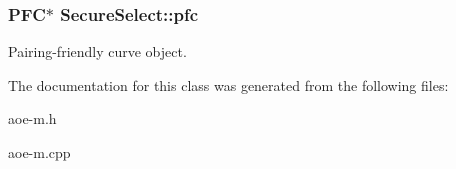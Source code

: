 \subsubsection[{\texorpdfstring{pfc}{pfc}}]{\setlength{\rightskip}{0pt plus 5cm}P\+FC$\ast$ Secure\+Select\+::pfc}\hypertarget{classSecureSelect_acd8fd34bdde543ca9711ac5e266a094d}{}\label{classSecureSelect_acd8fd34bdde543ca9711ac5e266a094d}
Pairing-\/friendly curve object. 

The documentation for this class was generated from the following files\+:\begin{DoxyCompactItemize}
\item 
aoe-\/m.\+h\item 
aoe-\/m.\+cpp\end{DoxyCompactItemize}
